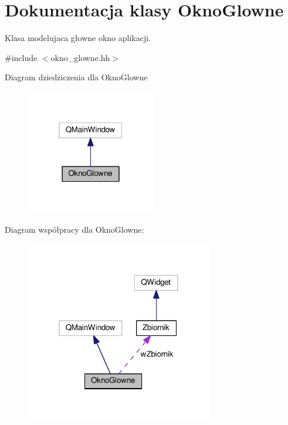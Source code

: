 \hypertarget{class_okno_glowne}{\section{Dokumentacja klasy Okno\-Glowne}
\label{class_okno_glowne}
}


Klasa modelujaca głowne okno aplikacji.  




{\ttfamily \#include $<$okno\-\_\-glowne.\-hh$>$}



Diagram dziedziczenia dla Okno\-Glowne\nopagebreak
\begin{figure}[H]
\begin{center}
\leavevmode
\includegraphics[width=160pt]{class_okno_glowne__inherit__graph}
\end{center}
\end{figure}


Diagram współpracy dla Okno\-Glowne\-:
\nopagebreak
\begin{figure}[H]
\begin{center}
\leavevmode
\includegraphics[width=231pt]{class_okno_glowne__coll__graph}
\end{center}
\end{figure}
